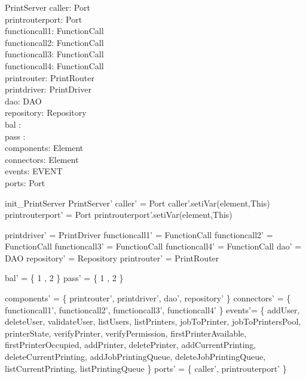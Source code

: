 \begin{schema}{PrintServer}
caller:  Port \\
printrouterport: Port \\
functioncall1: FunctionCall \\
functioncall2: FunctionCall \\
functioncall3: FunctionCall \\
functioncall4: FunctionCall \\
printrouter: PrintRouter \\
printdriver:  PrintDriver \\
dao: DAO \\
repository: Repository \\
bal : \nat \pfun \nat \\
pass : \nat \pfun \nat  \\

components: \pset Element \\
connectors: \pset Element \\
events: \pset EVENT \\
ports: \pset Port
\end{schema}

\begin{zed}
init\_PrintServer \sdef \lsch PrintServer'
                  \bbar caller' = \new Port
                  \land caller'.setiVar(element,This)
                  \land printrouterport' = \new Port
                  \land printrouterport'.setiVar(element,This)

                  \land printdriver' = \new PrintDriver
                  \land functioncall1' = \new FunctionCall
                  \land functioncall2' = \new FunctionCall
                  \land functioncall3' = \new FunctionCall
                  \land functioncall4' = \new FunctionCall
                  \land dao' = \new DAO
                  \land repository' = \new Repository
                  \land printrouter' = \new PrintRouter

                  \land bal' = \{ 1  , 2  \} \land pass' = \{ 1  , 2  \}

                  \land components' = \{ printrouter', printdriver', dao', repository' \}
                  \land connectors' = \{ functioncall1', functioncall2', functioncall3', functioncall4' \}
                  \land events'= \{ addUser, deleteUser, validateUser, listUsers, listPrinters, jobToPrinter, jobToPrintersPool, printerState, verifyPrinter, verifyPermission, firstPrinterAvailable, firstPrinterOccupied, addPrinter, deletePrinter, addCurrentPrinting, deleteCurrentPrinting, addJobPrintingQueue, deleteJobPrintingQueue, listCurrentPrinting, listPrintingQueue \}
                  \land ports' = \{ caller', printrouterport' \}  \rsch
                  \end{zed}

